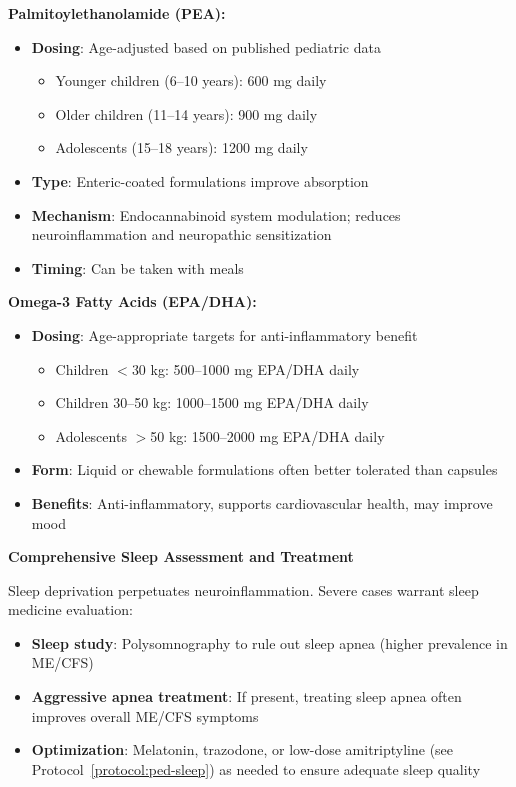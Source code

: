 \begin{protocol}
\textbf{Palmitoylethanolamide (PEA):}
\begin{itemize}
    \item \textbf{Dosing}: Age-adjusted based on published pediatric data
    \begin{itemize}
        \item Younger children (6--10 years): 600 mg daily
        \item Older children (11--14 years): 900 mg daily
        \item Adolescents (15--18 years): 1200 mg daily
    \end{itemize}
    \item \textbf{Type}: Enteric-coated formulations improve absorption
    \item \textbf{Mechanism}: Endocannabinoid system modulation; reduces neuroinflammation and neuropathic sensitization
    \item \textbf{Timing}: Can be taken with meals
\end{itemize}

\textbf{Omega-3 Fatty Acids (EPA/DHA):}
\begin{itemize}
    \item \textbf{Dosing}: Age-appropriate targets for anti-inflammatory benefit
    \begin{itemize}
        \item Children $<$30 kg: 500--1000 mg EPA/DHA daily
        \item Children 30--50 kg: 1000--1500 mg EPA/DHA daily
        \item Adolescents $>$50 kg: 1500--2000 mg EPA/DHA daily
    \end{itemize}
    \item \textbf{Form}: Liquid or chewable formulations often better tolerated than capsules
    \item \textbf{Benefits}: Anti-inflammatory, supports cardiovascular health, may improve mood
\end{itemize}

\textbf{Comprehensive Sleep Assessment and Treatment}

Sleep deprivation perpetuates neuroinflammation. Severe cases warrant sleep medicine evaluation:

\begin{itemize}
    \item \textbf{Sleep study}: Polysomnography to rule out sleep apnea (higher prevalence in ME/CFS)
    \item \textbf{Aggressive apnea treatment}: If present, treating sleep apnea often improves overall ME/CFS symptoms
    \item \textbf{Optimization}: Melatonin, trazodone, or low-dose amitriptyline (see Protocol~\ref{protocol:ped-sleep}) as needed to ensure adequate sleep quality
\end{itemize}


\end{protocol}

